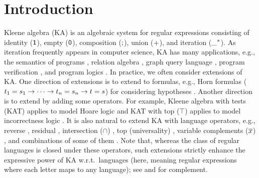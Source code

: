 \section{Introduction}\label{section: introduction}
Kleene algebra (KA) \cite{kleeneRepresentationEventsNerve1956,conwayRegularAlgebraFinite1971,kozenCompletenessTheoremKleene1991} is an algebraic system for regular expressions consisting of identity ($\mathsf{1}$), empty ($\mathsf{0}$), composition ($\mathbin{;}$), union ($\mathbin{+}$), and iteration ($\_^{*}$).
As iteration frequently appears in computer science, KA has many applications, e.g., the semantics of programs \cite{prattDynamicAlgebrasNature1980}, relation algebra \cite{ngRelationAlgebrasTransitive1984}, graph query language \cite{cruzGraphicalQueryLanguage1987,hellingsRelationAlgebraSemijoin2021}, program verification \cite{kozenKleeneAlgebraTests1996,hoareConcurrentKleeneAlgebra2011,smolkaGuardedKleeneAlgebra2019}, and program logics \cite{kozenHoareLogicKleene2000,ohearnIncorrectnessLogic2019,zhangIncorrectnessLogicKleene2022}.
In practice, we often consider extensions of KA.
One direction of extensions is to extend  to formulas, e.g., Horn formulas ($\term[1]_1 = \term[2]_1 \to \dots \to \term[1]_n = \term[2]_n \to \term[1] = \term[2]$) for considering hypotheses \cite{cohenHypothesesKleeneAlgebra1994,kozenKleeneAlgebraEquations2014,doumaneKleeneAlgebraHypotheses2019,pousToolsCompletenessKleene2024}.
Another direction is to extend  by adding some operators.
For example, Kleene algebra with tests (KAT) applies to model Hoare logic \cite{kozenHoareLogicKleene2000} and KAT with top ($\top$) applies to model incorrectness logic \cite{ohearnIncorrectnessLogic2019,zhangIncorrectnessLogicKleene2022,pousCompletenessTheoremsKleene2022}.
It is also natural to extend KA with language operators, e.g.,
reverse \cite{bloomNotesEquationalTheories1995},
residual \cite{buszkowskiComplexityEquationalTheory2006},
intersection ($\cap$) \cite{andrekaEquationalTheoryKleene2011},
top (universality) \cite{zhangIncorrectnessLogicKleene2022,pousCompletenessTheoremsKleene2022},
variable complements ($\overline{x}$) \cite{nakamuraWordstoLettersValuationsLanguage2023,nakamuraWordstoLettersValuationsLanguage2024},
and combinations of some of them \cite{brunetReversibleKleeneLattices2017,brunetCompleteAxiomatisationFragment2020}.
Note that, whereas the class of regular languages is closed under these operators, such extensions strictly enhance the expressive power of KA w.r.t.\ languages (here, meaning regular expressions where each letter maps to any language); see \cite{nakamuraWordstoLettersValuationsLanguage2023,nakamuraWordstoLettersValuationsLanguage2024} and  for complement.

